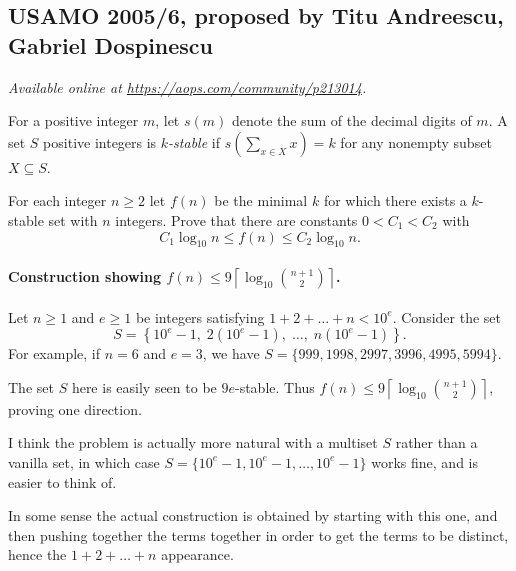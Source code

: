 \documentclass[11pt]{scrartcl}
\begin{document}
\subsection{USAMO 2005/6, proposed by Titu Andreescu, Gabriel Dospinescu}
\textsl{Available online at \url{https://aops.com/community/p213014}.}
\begin{mdframed}[style=mdpurplebox,frametitle={Problem statement}]
For a positive integer $m$,
let $s(m)$ denote the sum of the decimal digits of $m$.
A set $S$ positive integers is \emph{$k$-stable}
if $s(\sum_{x \in X} x) = k$ for any nonempty subset $X \subseteq S$.

For each integer $n \ge 2$ let $f(n)$ be the minimal $k$
for which there exists a $k$-stable set with $n$ integers.
Prove that there are constants $0 < C_1 < C_2$ with
\[ C_1 \log_{10} n \le f(n) \le C_2 \log_{10} n. \]
\end{mdframed}
\paragraph{Construction showing $f(n) \le 9 \left\lceil \log_{10} \binom{n+1}{2} \right\rceil$.}
Let $n \ge 1$ and $e \ge 1$ be integers satisfying $1 + 2 + \dots + n < 10^e$.
Consider the set
\[ S = \left\{ 10^e-1, \; 2(10^e-1), \; \dots, \; n(10^e-1) \right\}. \]
For example, if $n = 6$ and $e = 3$,
we have $S = \{999, 1998, 2997, 3996, 4995, 5994\}$.

The set $S$ here is easily seen to be $9e$-stable.
Thus $f(n) \le 9 \left\lceil \log_{10} \binom{n+1}{2} \right\rceil$,
proving one direction.

\begin{remark*}
  I think the problem is actually more natural
  with a multiset $S$ rather than a vanilla set,
  in which case $S = \{10^e-1, 10^e-1, \dots, 10^e-1\}$ works fine,
  and is easier to think of.

  In some sense the actual construction is obtained
  by starting with this one,
  and then pushing together the terms together
  in order to get the terms to be distinct,
  hence the $1+2+\dots+n$ appearance.
\end{remark*}
\end{document}
